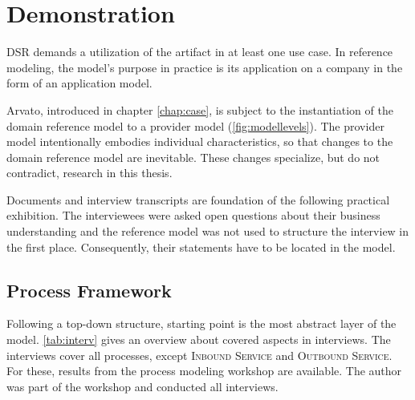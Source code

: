
\chapter{Demonstration}
\label{chap:demo}

\acrshort{DSR} demands a utilization of the artifact in at least one use case. In reference modeling, the model's purpose in practice is its application on a company in the form of an application model. 

Arvato, introduced in chapter \ref{chap:case}, is subject to the instantiation of the domain reference model to a provider model (\cf \Fig \ref{fig:modellevels}). The provider model intentionally embodies individual characteristics, so that changes to the domain reference model are inevitable. These changes specialize, but do not contradict, research in this thesis. 

Documents and interview transcripts are foundation of the following practical exhibition. The interviewees were asked open questions about their business understanding and the reference model was not used to structure the interview in the first place. Consequently, their statements have to be located in the model. 

	\section{Process Framework}
	
	Following a top-down structure, starting point is the most abstract layer of the model.
	 \Tab \ref{tab:interv} gives an overview about covered aspects in interviews. The interviews cover all processes, except \textsc{Inbound Service} and \textsc{Outbound Service}. For these, results from the process modeling workshop are available. The author was part of the workshop and conducted all interviews. 

